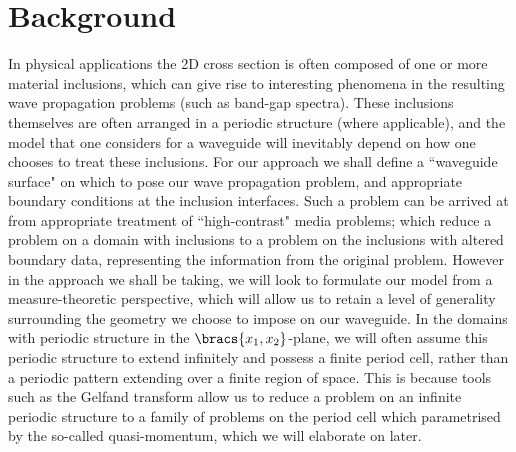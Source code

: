 \section{Background}
In physical applications the 2D cross section is often composed of one or more material inclusions, which can give rise to interesting phenomena in the resulting wave propagation problems (such as band-gap spectra).
These inclusions themselves are often arranged in a periodic structure (where applicable), and the model that one considers for a waveguide will inevitably depend on how one chooses to treat these inclusions.
For our approach we shall define a ``waveguide surface" on which to pose our wave propagation problem, and appropriate boundary conditions at the inclusion interfaces.
Such a problem can be arrived at from appropriate treatment of ``high-contrast" media problems; which reduce a problem on a domain with inclusions to a problem on the inclusions with altered boundary data, representing the information from the original problem.
However in the approach we shall be taking, we will look to formulate our model from a measure-theoretic perspective, which will allow us to retain a level of generality surrounding the geometry we choose to impose on our waveguide. 
In the domains with periodic structure in the $\bracs{x_1,x_2}$-plane, we will often assume this periodic structure to extend infinitely and possess a finite period cell, rather than a periodic pattern extending over a finite region of space.
This is because tools such as the Gelfand transform allow us to reduce a problem on an infinite periodic structure to a family of problems on the period cell which parametrised by the so-called quasi-momentum, which we will elaborate on later.

